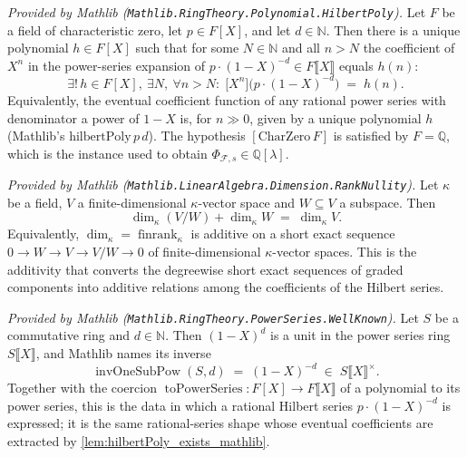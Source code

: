\begin{lemma}
  \label{lem:hilbertPoly_exists_mathlib}
  \mathlibok
  \textit{Provided by Mathlib
  (\texttt{Mathlib.RingTheory.Polynomial.HilbertPoly}).}
  Let \(F\) be a field of characteristic zero, let \(p \in F[X]\), and let
  \(d \in \mathbb{N}\). Then there is a unique polynomial \(h \in F[X]\) such that
  for some \(N \in \mathbb{N}\) and all \(n > N\) the coefficient of \(X^n\) in the
  power-series expansion of \(p \cdot (1 - X)^{-d} \in F\llbracket X\rrbracket\)
  equals \(h(n)\):
  \[
    \exists!\, h \in F[X],\ \exists N,\ \forall n > N : \;
    \bigl[ X^n \bigr]\bigl( p \cdot (1-X)^{-d} \bigr) \;=\; h(n).
  \]
  Equivalently, the eventual coefficient function of any rational power series
  with denominator a power of \(1 - X\) is, for \(n \gg 0\), given by a unique
  polynomial \(h\) (Mathlib's \(\mathrm{hilbertPoly}\,p\,d\)). The hypothesis
  \([\mathrm{CharZero}\,F]\) is satisfied by \(F = \mathbb{Q}\), which is the
  instance used to obtain \(\Phi_{\mathcal{F},s} \in \mathbb{Q}[\lambda]\).
\end{lemma}

\begin{lemma}
  \label{lem:finrank_ses_additive_mathlib}
  \mathlibok
  \textit{Provided by Mathlib
  (\texttt{Mathlib.LinearAlgebra.Dimension.RankNullity}).}
  Let \(\kappa\) be a field, \(V\) a finite-dimensional \(\kappa\)-vector space and
  \(W \subseteq V\) a subspace. Then
  \[
    \dim_\kappa (V / W) + \dim_\kappa W \;=\; \dim_\kappa V .
  \]
  Equivalently, \(\dim_\kappa = \operatorname{finrank}_\kappa\) is additive on a
  short exact sequence \(0 \to W \to V \to V/W \to 0\) of finite-dimensional
  \(\kappa\)-vector spaces. This is the additivity that converts the degreewise
  short exact sequences of graded components into additive relations among the
  coefficients of the Hilbert series.
\end{lemma}

\begin{lemma}
  \label{lem:invOneSubPow_mathlib}
  \mathlibok
  \textit{Provided by Mathlib
  (\texttt{Mathlib.RingTheory.PowerSeries.WellKnown}).}
  Let \(S\) be a commutative ring and \(d \in \mathbb{N}\). Then \((1 - X)^d\) is a
  unit in the power series ring \(S\llbracket X\rrbracket\), and Mathlib names its
  inverse
  \[
    \operatorname{invOneSubPow}(S, d) \;=\; (1 - X)^{-d}
      \;\in\; S\llbracket X\rrbracket^{\times}.
  \]
  Together with the coercion
  \(\operatorname{toPowerSeries} : F[X] \to F\llbracket X\rrbracket\) of a
  polynomial to its power series, this is the data in which a rational Hilbert
  series \(p \cdot (1 - X)^{-d}\) is expressed; it is the same rational-series shape
  whose eventual coefficients are extracted by
  \cref{lem:hilbertPoly_exists_mathlib}.
\end{lemma}

